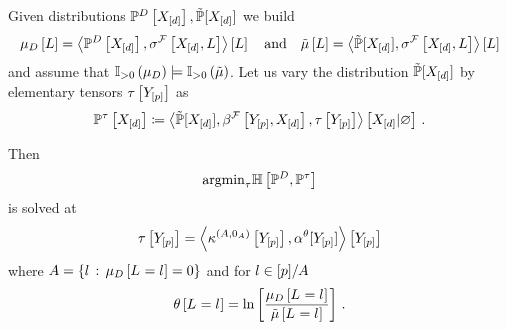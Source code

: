 \begin{lemma}
    Given distributions $\mathbb{P}^{D}\left[X_{[d]}\right],\tilde{\mathbb{P}}[X_{[d]}]$ we build
    \begin{align*}
        \mu_{D}\left[L\right] = \left\langle \mathbb{P}^{D}\left[X_{[d]}\right],\sigma^{\mathcal{F}}\left[X_{[d]},L\right]\right\rangle \left[ L \right]
        \quad\text{and}\quad
        \tilde{\mu}\left[L\right] = \left\langle \tilde{\mathbb{P}}[X_{[d]}],\sigma^{\mathcal{F}}\left[X_{[d]},L\right]\right\rangle \left[ L \right]
    \end{align*}
    and assume that $\mathbb{I}_{>0}\left(\mu_{D}\right)\models\mathbb{I}_{>0}\left(\tilde{\mu}\right)$. %
    Let us vary the distribution $\tilde{\mathbb{P}}[X_{[d]}]$ by elementary tensors $\tau\left[Y_{[p]}\right]$ as
    \begin{align*} %
        \probofat{\hypercore}{\shortcatvariables}
        \coloneqq \normalizationof{\secprobwith,\mlnstatccwith,\hypercoreat{\headvariables}}{\shortcatvariables} \, .
    \end{align*}

    Then
    \begin{align*}
        \mathrm{argmin}_{\tau} \mathbb{H}\left[\mathbb{P}^{D},\mathbb{P}^{\tau}\right]
    \end{align*}
    is solved at
    \begin{align*}
        \tau\left[Y_{[p]}\right]
        = \left\langle \kappa^{(A,0_{A})}\left[Y_{[p]}\right],\alpha^{\theta}[Y_{[p]}]\right\rangle \left[ Y_{[p]} \right]
    \end{align*}
    where $A=\{l\,:\,\mu_{D}\left[L_{}=l_{}\right]=0\}$ and for $l\in[p]/A$
    \begin{align*}
        \theta\left[L_{}=l_{}\right] = \ln \left[ \frac{\mu_{D}\left[L_{}=l_{}\right]}{\tilde{\mu}\left[L_{}=l_{}\right]} \right] \, .
    \end{align*}
\end{lemma}
